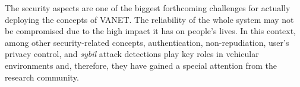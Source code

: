 \documentclass[preprint,12pt]{elsarticle}
\begin{document}

The security aspects are one of the biggest forthcoming challenges for actually deploying the concepts of VANET. The reliability of the whole system may not be compromised due to the high impact it has on people's lives. In this context, among other security-related concepts, authentication, non-repudiation, user's privacy control, and \textit{sybil} attack detections play key roles in vehicular environments and, therefore, they have gained a special attention from the research community.


%
%
%
\end{document}
